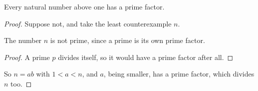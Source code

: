 \begin{theorem}
Every natural number above one has a prime factor.
\end{theorem}
\begin{proof}
Suppose not, and take the least counterexample $n$.
\begin{claim}
The number $n$ is not prime, since a prime is its own prime factor.
\end{claim}
\begin{proof}
A prime $p$ divides itself, so it would have a prime factor after all.
\end{proof}
So $n = ab$ with $1 < a < n$, and $a$, being smaller, has a prime factor,
which divides $n$ too.
\end{proof}
